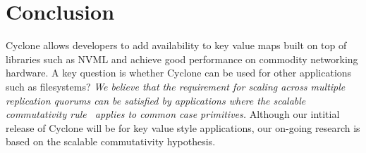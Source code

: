 \documentclass[letterpaper,twocolumn,10pt]{article}
\begin{document}
\section{Conclusion}
Cyclone allows developers to add availability to key value maps built on top of
libraries such as NVML and achieve good performance on commodity networking
hardware. A key question is whether Cyclone can be used for other applications
such as filesystems? \emph{We believe that the requirement for scaling across
  multiple replication quorums can be satisfied by applications where the
  scalable commutativity rule~\cite{scalable_commutativity} applies to common
  case primitives.} Although our intitial release of Cyclone will be for key
value style applications, our on-going research is based on the scalable
commutativity hypothesis.
\newcommand\myurl[2]{\url{#1}}


\end{document}

